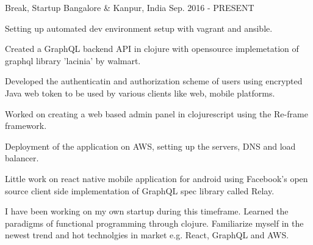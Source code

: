 

\begin{cventries}

  \cventrywithsummary
    {} %
    {Break, Startup} %
    {Bangalore \& Kanpur, India} %
    {Sep. 2016 - PRESENT} %
    {
      \begin{cvitems} %
        \item {Setting up automated dev environment setup with vagrant and ansible.}
        \item {Created a GraphQL backend API in clojure with opensource implemetation of graphql library 'lacinia' by walmart.}
        \item {Developed the authenticatin and authorization scheme of users using encrypted Java web token to be used by various clients like web, mobile platforms.}
        \item {Worked on creating a web based admin panel in clojurescript using the Re-frame framework.}
        \item {Deployment of the application on AWS, setting up the servers, DNS and load balancer.}
        \item {Little work on react native mobile application for android using Facebook's open source client side implementation of GraphQL spec library called Relay.}
      \end{cvitems}
    }
    {
      \begin{cvsummary}
        I have been working on my own startup during this timeframe. Learned the paradigms of functional programming through clojure. Familiarize myself in the newest trend and hot technolgies in market e.g. React, GraphQL and AWS.
      \end{cvsummary}
    }


\end{cventries}
